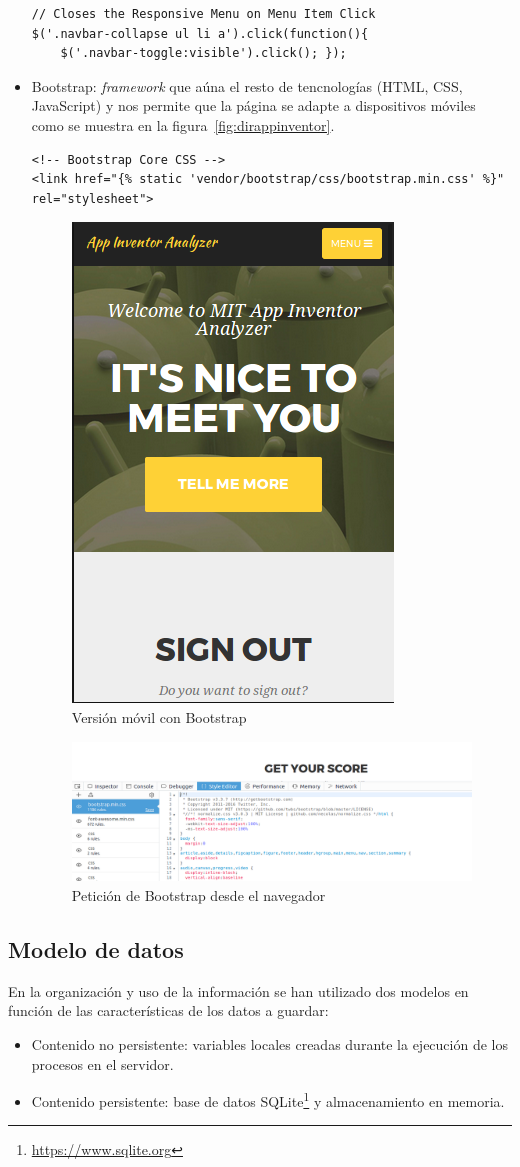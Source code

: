 \documentclass[a4paper, 12pt]{book}
\begin{document}
\begin{itemize}
\begin{lstlisting}[language=HTML]
// Closes the Responsive Menu on Menu Item Click
$('.navbar-collapse ul li a').click(function(){ 
    $('.navbar-toggle:visible').click(); });
	\end{lstlisting}
	\item Bootstrap: \textit{framework} que aúna el resto de tencnologías (HTML, CSS, JavaScript) y nos permite que la página se adapte a dispositivos móviles como se muestra en la figura~\ref{fig:dirappinventor}.
		\begin{lstlisting}
<!-- Bootstrap Core CSS -->
<link href="{% static 'vendor/bootstrap/css/bootstrap.min.css' %}" rel="stylesheet">
		\end{lstlisting}
		\begin{figure}[H]
			  \centering
			  \includegraphics[width=0.30\linewidth, keepaspectratio]{img/mobileVersion}
			  \caption{Versión móvil con Bootstrap}
			  \label{fig:mobileVersion}
		\end{figure} 
		\begin{figure}[H]
			  \centering
			  \includegraphics[width=\linewidth, keepaspectratio]{img/bootstrapDebug}
			  \caption{Petición de Bootstrap desde el navegador}
			  \label{fig:mobileVersion}
		\end{figure} 

\end{itemize}                                   

\subsection{Modelo de datos}
En la organización y uso de la información se han utilizado dos modelos en función de las características de los datos a guardar: 
\begin{itemize}
	\item Contenido no persistente: variables locales creadas durante la ejecución de los procesos en el servidor. 
	\item Contenido persistente: base de datos SQLite\footnote{\url{https://www.sqlite.org}} y almacenamiento en memoria.
\end{itemize}                                   
\end{document}
